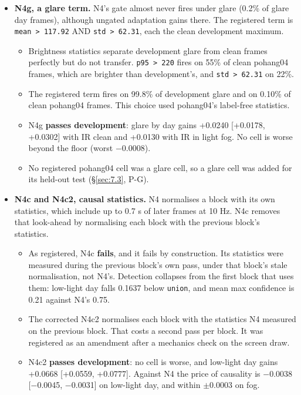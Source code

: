 \documentclass[10pt]{article}
\begin{document}
\begin{itemize}
\item \textbf{N4g, a glare term.} N4's gate almost never fires under glare (0.2\% of glare day frames), although ungated adaptation gains there. The registered term is \texttt{mean > 117.92} AND \texttt{std > 62.31}, each the clean development maximum.
\begin{itemize}
\item Brightness statistics separate development glare from clean frames perfectly but do not transfer. \texttt{p95 > 220} fires on 55\% of clean pohang04 frames, which are brighter than development's, and \texttt{std > 62.31} on 22\%.
\item The registered term fires on 99.8\% of development glare and on 0.10\% of clean pohang04 frames. This choice used pohang04's label-free statistics.
\item N4g \textbf{passes development}: glare by day gains +0.0240 [+0.0178, +0.0302] with IR clean and +0.0130 with IR in light fog. No cell is worse beyond the floor (worst $-$0.0008).
\item No registered pohang04 cell was a glare cell, so a glare cell was added for its held-out test (\S\ref{sec:7.3}, P-G).
\end{itemize}
\item \textbf{N4c and N4c2, causal statistics.} N4 normalises a block with its own statistics, which include up to 0.7 s of later frames at 10 Hz. N4c removes that look-ahead by normalising each block with the previous block's statistics.
\begin{itemize}
\item As registered, N4c \textbf{fails}, and it fails by construction. Its statistics were measured during the previous block's own pass, under that block's stale normalisation, not N4's. Detection collapses from the first block that uses them: low-light day falls 0.1637 below \texttt{union}, and mean max confidence is 0.21 against N4's 0.75.
\item The corrected N4c2 normalises each block with the statistics N4 measured on the previous block. That costs a second pass per block. It was registered as an amendment after a mechanics check on the screen draw.
\item N4c2 \textbf{passes development}: no cell is worse, and low-light day gains +0.0668 [+0.0559, +0.0777]. Against N4 the price of causality is $-$0.0038 [$-$0.0045, $-$0.0031] on low-light day, and within $\pm$0.0003 on fog.
\end{itemize}

\end{itemize}
\end{document}
